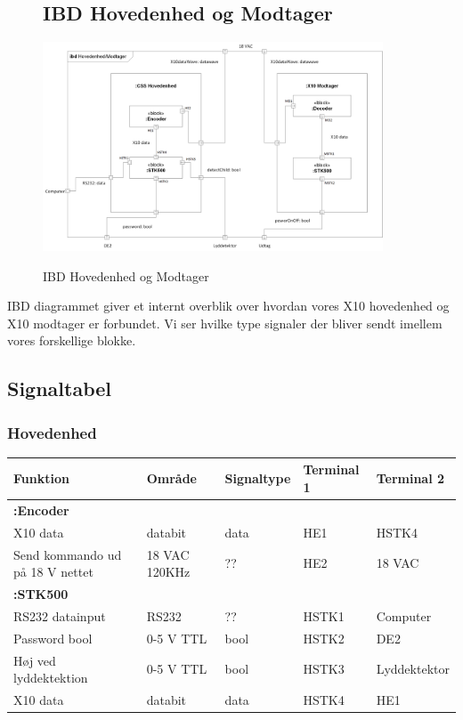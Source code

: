 \begin{figure}[htbp] \centering
\subsection{IBD Hovedenhed og Modtager}
{\includegraphics[width=0.9\textwidth]{billeder/diagrammer/IBD_Hovedenhed_Modtager}}
\caption{IBD Hovedenhed og Modtager}
\label{lab:ibdhovedenhedmodtager}
\end{figure}
IBD diagrammet giver et internt overblik over hvordan vores X10 hovedenhed og X10 modtager er forbundet. Vi ser hvilke type signaler der bliver sendt imellem vores forskellige blokke.

\subsection{Signaltabel}

\subsubsection{Hovedenhed}
\begin{tabular}{|p{3cm}|p{}|p{}|p{}|p{}|}
\hline 
\textbf{Funktion} &\textbf{Område} &\textbf{Signaltype} &\textbf{Terminal 1} &\textbf{Terminal 2} \\ 
\hline 
\multicolumn{5}{|l|}{\textbf{:Encoder}} \\ 
\hline 
X10 data &databit &data &HE1 &HSTK4\\ 
\hline 
Send kommando ud på 18 V nettet &18 VAC \newline 120KHz &?? &HE2 &18 VAC\\ 
\hline 
\multicolumn{5}{|l|}{\textbf{:STK500}} \\ 
\hline 
RS232 datainput &RS232 &?? &HSTK1 &Computer\\ 
\hline 
Password bool  &0-5 V TTL &bool &HSTK2 &DE2\\ 
\hline 
Høj ved lyddektektion &0-5 V TTL &bool &HSTK3 &Lyddektektor\\ 
\hline 
X10 data &databit &data &HSTK4 &HE1\\ 
\hline 
\end{tabular} 

